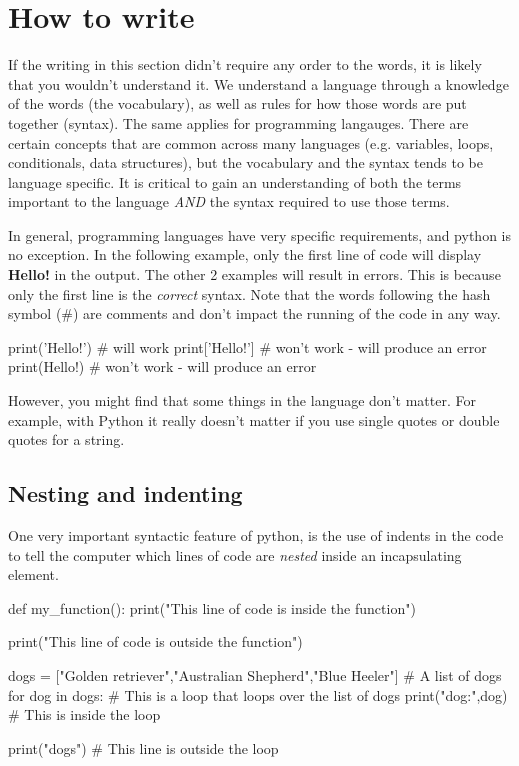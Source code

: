 \section{How to write}

If the writing in this section didn't require any order to the words, it is likely that you wouldn't understand it. We understand a language through a knowledge of the words (the vocabulary), as well as rules for how those words are put together (syntax). The same applies for programming langauges. There are certain concepts that are common across many languages (e.g. variables, loops, conditionals, data structures), but the vocabulary and the syntax tends to be language specific. It is critical to gain an understanding of both the terms important to the language \textit{AND} the syntax required to use those terms.

In general, programming languages have very specific requirements, and python is no exception. In the following example, only the first line of code will display \textbf{Hello!} in the output. The other 2 examples will result in errors. This is because only the first line is the \textit{correct} syntax. Note that the words following the hash symbol (\#) are comments and don't impact the running of the code in any way.

\begin{pycode}
    print('Hello!') # will work
    print['Hello!'] # won't work - will produce an error
    print(Hello!) # won't work - will produce an error
\end{pycode}

However, you might find that some things in the language don't matter. For example, with Python it really doesn't matter if you use single quotes or double quotes for a string.

\subsection{Nesting and indenting}

One very important syntactic feature of python, is the use of indents in the code to tell the computer which lines of code are \textit{nested} inside an incapsulating element.

\begin{pycode}
    def my_function():
    print("This line of code is inside the function")

    print("This line of code is outside the function")

    dogs = ["Golden retriever","Australian Shepherd","Blue Heeler"] # A list of dogs
    for dog in dogs: # This is a loop that loops over the list of dogs
    print("dog:",dog) # This is inside the loop

    print("dogs") # This line is outside the loop
\end{pycode}





